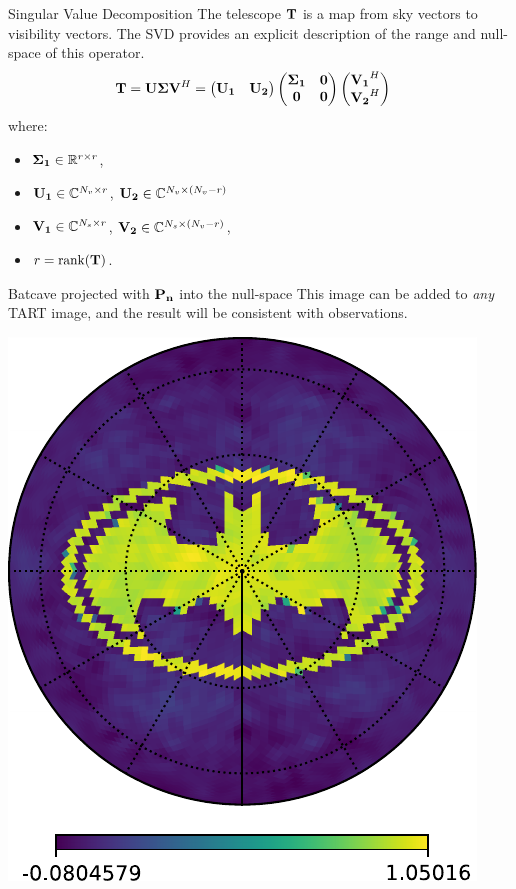 \documentclass[ignorenonframetext]{beamer}
\begin{document}
\begin{frame}{Singular Value Decomposition}
 The telescope $\mathbf{T}$ is a map from sky vectors to visibility vectors. The SVD provides an explicit description of the range and null-space of this operator.
 \begin{align}
 \mathbf{T} &= \mathbf{U} \mathbf{\Sigma} \mathbf{V}^H  = 
        \begin{pmatrix}
             \mathbf{U_1} & \mathbf{U_2}
        \end{pmatrix} 
        \begin{pmatrix}
             \mathbf{\Sigma_1} & \mathbf{0} \\
             \mathbf{0} & \mathbf{0} \\
        \end{pmatrix} 
        \begin{pmatrix}
             \mathbf{V_1}^H \\ \mathbf{V_2}^H
        \end{pmatrix}
        \label{eqn:svd}
\end{align}
where:
\begin{itemize}
 \item $\mathbf{\Sigma_1} \in \mathbb{R}^{r \times r}$, 
 \item $\mathbf{U_1} \in \mathbb{C}^{N_v \times r}$, $ \mathbf{U_2} \in \mathbb{C}^{N_v \times (N_v - r)}$
 \item $\mathbf{V_1} \in \mathbb{C}^{N_s \times r}$, $ \mathbf{V_2} \in \mathbb{C}^{N_s \times (N_v - r)}$, 
 \item $r = \mathrm{rank}(\mathbf{T})$.
\end{itemize}
\end{frame}

\begin{frame}{Batcave projected with $ \mathbf{P_n}$ into the null-space}
This image can be added to {\em any} TART image, and the result will be consistent with observations.
\begin{center}
 \includegraphics[width=0.6\linewidth]{fig/null_space_batman.pdf}
\end{center}
\end{frame}
\end{document}
